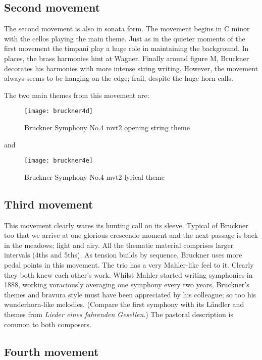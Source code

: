 \subsection{Second movement}

The second movement is also in sonata form. The movement begins in C minor with the cellos playing the main theme. Just as in the quieter moments of the first movement the timpani play a huge role in maintaining the background. In places, the brass harmonies hint at Wagner. Finally around figure M, Bruckner decorates his harmonies with more intense string writing. However, the movement always seems to be hanging on the edge; frail, despite the huge horn calls. 

The two main themes from this movement are: 
\begin{figure}[H]
\centering
\texttt{[image: bruckner4d]}\caption{Bruckner Symphony No.4 mvt2 opening string theme}
\label{fig:bruckner1c}
\end{figure}

and

\begin{figure}[H]
\centering
\texttt{[image: bruckner4e]}\caption{Bruckner Symphony No.4 mvt2 lyrical theme}
\label{fig:bruckner1c}
\end{figure}

\subsection{Third movement}

This movement clearly wares its hunting call on its sleeve. Typical of Bruckner too that we arrive at one glorious crescendo moment and the next passage is back in the meadows; light and airy. All the thematic material comprises larger intervals (4ths and 5ths). As tension builds by sequence, Bruckner uses more pedal points in this movement. The trio has a very Mahler-like feel to it. Clearly they both knew each other's work. Whilst Mahler started writing symphonies in 1888, working voraciously averaging one symphony every two years, Bruckner's themes and bravura style must have been appreciated by his colleague; so too his wunderhorn-like melodies. (Compare the first symphony with its L\"andler and themes from \textit{Lieder eines fahrenden Gesellen}.) The pastoral description is common to both composers.  

\subsection{Fourth movement}

